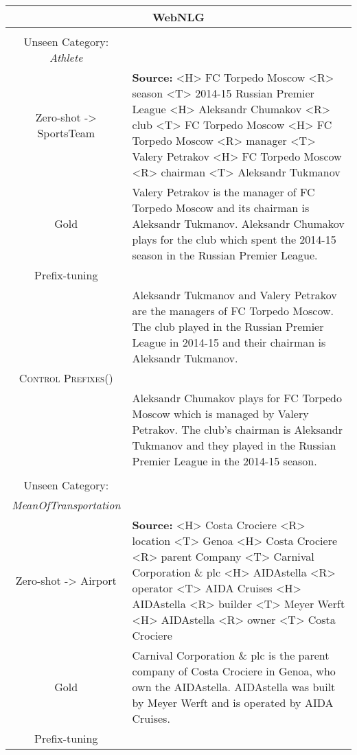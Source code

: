 \documentclass[11pt]{article}
\newcommand{\control}{\textsc{Control Prefixes}\xspace}
\newcommand{\bl}[1]{{\color{blue}  #1}}
\newcommand{\rd}[1]{{\color{red}  #1}}
\begin{document}
\begin{table*}[bth!]
\scriptsize
  \centering
  \renewcommand{\arraystretch}{1.1}
  \begin{tabular}{c|p{}}
  \hline
    \multicolumn{2}{c}{\textbf{WebNLG}} \\  \hline
    
 \\ Unseen Category: \bl{\textit{Athlete}}\\
  Zero-shot -> \rd{SportsTeam} & \textbf{Source:} <H> FC Torpedo Moscow <R> season <T> 2014-15 Russian Premier League <H> Aleksandr Chumakov <R> club <T> FC Torpedo Moscow <H> FC Torpedo Moscow <R> manager <T> Valery Petrakov <H> FC Torpedo Moscow <R> chairman <T> Aleksandr Tukmanov

  \\ \hline
Gold & Valery Petrakov is the manager of FC Torpedo Moscow and its chairman is Aleksandr Tukmanov. Aleksandr Chumakov plays for the club which spent the 2014-15 season in the Russian Premier League.\\ \hline
Prefix-tuning\\

& Aleksandr Tukmanov and Valery Petrakov are the managers of FC Torpedo Moscow. The club played in the Russian Premier League in 2014-15 and their chairman is Aleksandr Tukmanov. \\\hline
\control ()\\& Aleksandr Chumakov plays for FC Torpedo Moscow which is managed by Valery Petrakov. The club's chairman is Aleksandr Tukmanov and they played in the Russian Premier League in the 2014-15 season. \\ \midrule \hline

    \\ Unseen Category:\\ \bl{\textit{MeanOfTransportation}}\\
  Zero-shot -> \rd{Airport} & \textbf{Source:} <H> Costa Crociere <R> location <T> Genoa <H> Costa Crociere <R> parent Company <T> Carnival Corporation \& plc <H> AIDAstella <R> operator <T> AIDA Cruises <H> AIDAstella <R> builder <T> Meyer Werft <H> AIDAstella <R> owner <T> Costa Crociere

  \\ \hline
Gold & Carnival Corporation \& plc is the parent company of Costa Crociere in Genoa, who own the AIDAstella. AIDAstella was built by Meyer Werft and is operated by AIDA Cruises.\\ \hline
Prefix-tuning\\


\end{tabular}
\end{table*}
\end{document}
